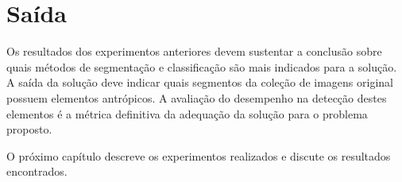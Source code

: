 \section{Saída}

 Os resultados dos experimentos anteriores devem sustentar a conclusão sobre quais métodos de segmentação e classificação são mais indicados para a solução. A saída da solução deve indicar quais segmentos da coleção de imagens original possuem elementos antrópicos. A avaliação do desempenho na detecção destes elementos é a métrica definitiva da adequação da solução para o problema proposto.

O próximo capítulo descreve os experimentos realizados e discute os resultados encontrados.
